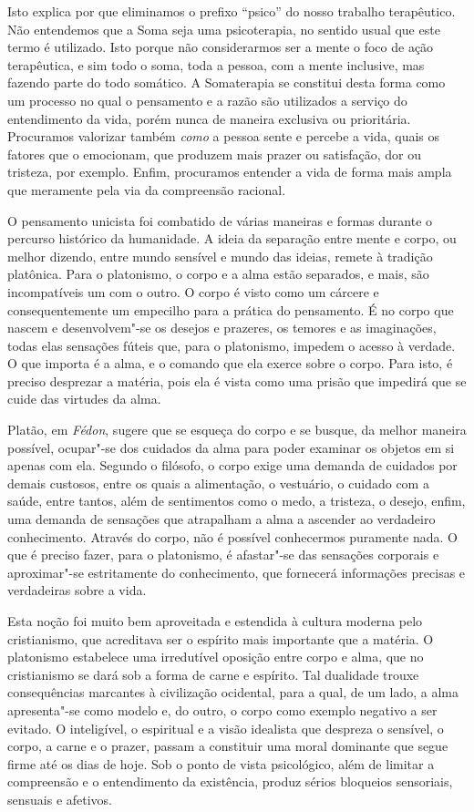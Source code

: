Isto explica por que eliminamos o prefixo ``psico'' do nosso trabalho
terapêutico. Não entendemos que a Soma seja uma psicoterapia, no sentido
usual que este termo é utilizado. Isto porque não considerarmos ser
a mente o foco de ação terapêutica, e sim todo o soma, toda a pessoa,
com a mente inclusive, mas fazendo parte do todo somático. A Somaterapia
se constitui desta forma como um processo no qual o pensamento e a razão
são utilizados a serviço do entendimento da vida, porém nunca de maneira
exclusiva ou prioritária. Procuramos valorizar também \emph{como} a
pessoa sente e percebe a vida, quais os fatores que o emocionam, que
produzem mais prazer ou satisfação, dor ou tristeza, por exemplo.
Enfim, procuramos entender a vida de forma mais ampla que meramente pela
via da compreensão racional.

O pensamento unicista foi combatido de várias maneiras e formas durante
o percurso histórico da humanidade. A ideia da separação entre mente e
corpo, ou melhor dizendo, entre mundo sensível e mundo das ideias,
remete à tradição platônica. Para o platonismo, o corpo e a alma estão
separados, e mais, são incompatíveis um com o outro. O corpo é visto
como um cárcere e consequentemente um empecilho para a prática do
pensamento. É no corpo que nascem e desenvolvem"-se os desejos e
prazeres, os temores e as imaginações, todas elas sensações fúteis que,
para o platonismo, impedem o acesso à verdade. O que importa é a alma, e
o comando que ela exerce sobre o corpo. Para isto, é preciso desprezar a
matéria, pois ela é vista como uma prisão que impedirá que se cuide das
virtudes da alma.

Platão, em \emph{Fédon}, sugere que se esqueça do corpo e se busque, da
melhor maneira possível, ocupar"-se dos cuidados da alma para poder
examinar os objetos em si apenas com ela. Segundo o filósofo, o corpo
exige uma demanda de cuidados por demais custosos, entre os quais a
alimentação, o vestuário, o cuidado com a saúde, entre tantos, além de
sentimentos como o medo, a tristeza, o desejo, enfim, uma demanda de
sensações que atrapalham a alma a ascender ao verdadeiro conhecimento.
Através do corpo, não é possível conhecermos puramente nada. O que é
preciso fazer, para o platonismo, é afastar"-se das sensações
corporais e aproximar"-se estritamente do conhecimento, que %
fornecerá informações precisas e verdadeiras sobre a vida.

Esta noção foi muito bem aproveitada e estendida à cultura moderna pelo
cristianismo, que acreditava ser o espírito mais importante que a
matéria. O platonismo estabelece uma irredutível oposição entre corpo e
alma, que no cristianismo se dará sob a forma de carne e espírito. Tal
dualidade trouxe consequências marcantes à civilização ocidental, para a qual,
de um lado, a alma apresenta"-se como modelo e, do outro, o corpo como
exemplo negativo a ser evitado. O inteligível, o espiritual e a visão
idealista que despreza o sensível, o corpo, a carne e o prazer, passam a
constituir uma moral dominante que segue firme até os dias de hoje. Sob
o ponto de vista psicológico, além de limitar a compreensão e o
entendimento da existência, produz sérios bloqueios sensoriais, sensuais
e afetivos.

